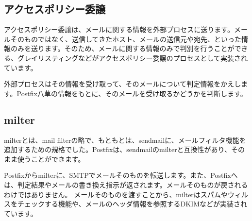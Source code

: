 \subsection{アクセスポリシー委譲}
アクセスポリシー委譲は、メールに関する情報を外部プロセスに送ります。メールそのものではなく、送信してきたホスト、メールの送信元や宛先、といった情報のみを送ります。そのため、メールに関する情報のみで判別を行うことができる、グレイリスティングなどがアクセスポリシー委譲のプロセスとして実装されています。

外部プロセスはその情報を受け取って、そのメールについて判定情報をかえします。Postfix八草の情報をもとに、そのメールを受け取るかどうかを判断します。

\subsection{milter}
milterとは、mail filterの略で、もともとは、sendmailに、メールフィルタ機能を追加するための規格でした。Postfixは、sendmailのmilterと互換性があり、そのまま使うことができます。

Postfixからmilterに、SMTPでメールそのものを転送します。また、Postfixへは、判定結果やメールの書き換え指示が返されます。メールそのものが戻されるわけではありません。
メールそのものを渡すことから、milterはスパムやウィルスをチェックする機能や、メールのヘッダ情報を参照するDKIMなどが実装されています。